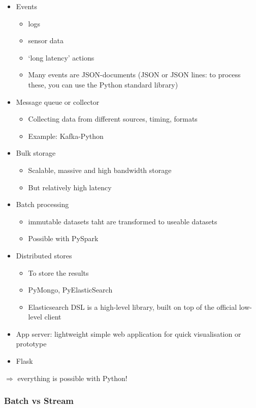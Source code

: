 \documentclass{article}
\begin{document}
\begin{itemize}
    \item Events
    \begin{itemize}
        \item logs
        \item sensor data
        \item `long latency' actions
        \item Many events are JSON-documents (JSON or JSON lines: to process these, you can use the Python standard library)
    \end{itemize}
    \item Message queue or collector
    \begin{itemize}
        \item Collecting data from different sources, timing, formats
        \item Example: Kafka-Python
    \end{itemize}
    \item Bulk storage
    \begin{itemize}
        \item Scalable, massive and high bandwidth storage
        \item But relatively high latency
    \end{itemize}
    \item Batch processing
    \begin{itemize}
        \item immutable datasets taht are transformed to useable datasets
        \item Possible with PySpark
    \end{itemize}
    \item Distributed stores
    \begin{itemize}
        \item To store the results
        \item PyMongo, PyElasticSearch
        \item Elasticsearch DSL is a high-level library, built on top of the official low-level client
    \end{itemize}
    \item App server: lightweight simple web application for quick visualisation or prototype
    \item Flask
\end{itemize}

$\Rightarrow$ everything is possible with Python!

\subsubsection{Batch vs Stream}
\end{document}

